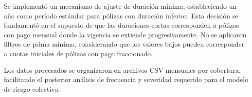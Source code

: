 Se implementó un mecanismo de ajuste de duración mínima, estableciendo un año como período estándar para pólizas con duración inferior. Esta decisión se fundamentó en el supuesto de que las duraciones cortas corresponden a pólizas con pago mensual donde la vigencia se extiende progresivamente. No se aplicaron filtros de prima mínima, considerando que los valores bajos pueden corresponder a cuotas iniciales de pólizas con pago fraccionado.

Los datos procesados se organizaron en archivos CSV mensuales por cobertura, facilitando el posterior análisis de frecuencia y severidad requerido para el modelo de riesgo colectivo.